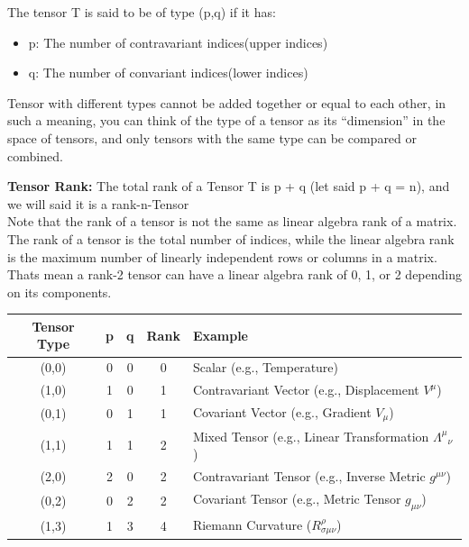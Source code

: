 \newpage
\begin{extra}
  The tensor T is said to be of type (p,q) if it has:
  \begin{itemize}
    \item p: The number of contravariant indices(upper indices)
    \item q: The number of convariant indices(lower indices)
  \end{itemize}
  Tensor with different types cannot be added together or equal to each other, in such a meaning, you can think of the type of a tensor as its ``dimension'' in the space of tensors, and only tensors with the same type can be compared or combined.

  \bigskip\noindent
  \textbf{Tensor Rank:}  The total rank of a Tensor T is p + q (let said p + q = n), and we will said it is a rank-n-Tensor \\

  \smallskip\noindent
  Note that the rank of a tensor is not the same as linear algebra rank of a matrix. The rank of a tensor is the total number of indices, while the linear algebra rank is the maximum number of linearly independent rows or columns in a matrix. Thats mean a rank-2 tensor can have a linear algebra rank of 0, 1, or 2 depending on its components.

  \bigskip\noindent
  \begin{center}
    \begin{tabular}{@{}c|c|c|c|l@{}}
      \toprule
      \textbf{Tensor Type} & \textbf{p} & \textbf{q} & \textbf{Rank} & \textbf{Example} \\
      \midrule
      (0,0) & 0 & 0 & 0 & Scalar (e.g., Temperature) \\
      (1,0) & 1 & 0 & 1 & Contravariant Vector (e.g., Displacement $V^\mu$) \\
      (0,1) & 0 & 1 & 1 & Covariant Vector (e.g., Gradient $V_\mu$) \\
      (1,1) & 1 & 1 & 2 & Mixed Tensor (e.g., Linear Transformation $\Lambda^\mu{}_\nu$) \\
      (2,0) & 2 & 0 & 2 & Contravariant Tensor (e.g., Inverse Metric $g^{\mu \nu}$) \\
      (0,2) & 0 & 2 & 2 & Covariant Tensor (e.g., Metric Tensor $g_{\mu \nu}$) \\
      (1,3) & 1 & 3 & 4 & Riemann Curvature ($R^{\rho}_{\sigma \mu \nu}$) \\
      \bottomrule
    \end{tabular}
  \end{center}
\end{extra}


